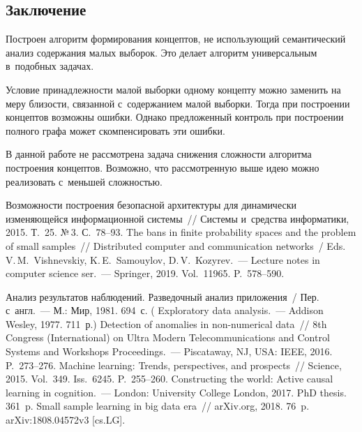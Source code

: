 \begin{multicols}{2}
  \section{Заключение }
  
  Построен алгоритм формирования концептов, не использующий семантический 
анализ содержания малых выборок. Это делает алгоритм универсальным 
в~подобных задачах. 
  
  Условие принадлежности малой выборки одному концепту можно заменить на 
меру близости, связанной с~содержанием малой выборки. Тогда при построении 
концептов возможны ошибки. Однако предложенный контроль при построении 
полного графа может скомпенсировать эти ошибки.
  
  В данной работе не рассмотрена задача снижения сложности алгоритма 
построения концептов. Возможно, что рассмотренную выше идею можно 
реализовать с~меньшей сложностью.

\vspace*{-6pt}
  
{\small\frenchspacing
 {%
 \begin{thebibliography}{9}

 Возможности построения безопасной 
архитектуры для динамически изменяющейся информационной системы~// Системы и~средства 
информатики, 2015. Т.~25. №\,3. С.~78--93.
 The bans in finite probability spaces and the problem of 
small samples~// Distributed computer and communication networks~/ Eds. V.\,M.~Vishnevskiy, K.\,E.~Samouylov, 
D.\,V.~Kozyrev.~--- Lecture notes in computer 
science ser.~--- Springer,  2019. Vol.~11965. P.~578--590.

 Анализ результатов наблюдений. Разведочный анализ приложения~/ Пер. 
с~англ.~--- М.: Мир, 1981. 694~с. ( Exploratory data analysis.~--- Addison 
Wesley, 1977. 711~р.)
 Detection of anomalies in non-numerical data~// 8th 
Congress (International) on Ultra Modern Telecommunications and Control Systems and Workshops 
Proceedings.~--- Piscataway, NJ, USA: IEEE, 2016. P.~273--276.
 Machine learning: Trends, perspectives, and prospects~// Science, 
2015. Vol.~349. Iss.~6245. P.~255--260.
 Constructing the world: Active causal learning in cognition.~--- 
London: University College London, 2017.  PhD thesis. 361~p. 
 Small sample learning in big data era~// arXiv.org, 
2018. 76~p. arXiv:1808.04572v3 [cs.LG].
 \end{thebibliography}

 }
 }

\end{multicols}

